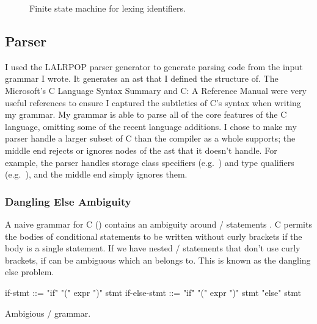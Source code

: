 \documentclass[00-main.tex]{subfiles}
\begin{document}
\begin{figure}[!htb]
  \centering
  \caption{Finite state machine for lexing identifiers.}
  \label{fig:lexing identifiers fsm}
\end{figure}


\subsection{Parser}

I used the LALRPOP parser generator  to generate parsing code from the input grammar I wrote.
It generates an \gls{ast} that I defined the structure of.
The Microsoft's C Language Syntax Summary  and C: A Reference Manual  were very useful references to ensure I captured the subtleties of C's syntax when writing my grammar.
My grammar is able to parse all of the core features of the C language, omitting some of the recent language additions. I chose to make my parser handle a larger subset of C than the compiler as a whole supports; the middle end rejects or ignores nodes of the \gls{ast} that it doesn't handle. For example, the parser handles storage class specifiers (e.g.\ ) and type qualifiers (e.g.\ ), and the middle end simply ignores them.

\subsubsection{Dangling Else Ambiguity}

A naive grammar for C () contains an ambiguity around / statements .
C permits the bodies of conditional statements to be written without curly brackets if the body is a single statement.
If we have nested / statements that don't use curly brackets, if can be ambiguous which  an  belongs to. This is known as the dangling else problem.

\begin{listing}[!ht]
  \begin{GrammarListing}
    if-stmt      ::= "if" "(" expr ")" stmt
    if-else-stmt ::= "if" "(" expr ")" stmt "else" stmt
  \end{GrammarListing}
  \caption{Ambigious / grammar.}
  \label{lst:ambiguous if-else grammar}
\end{listing}
\end{document}
